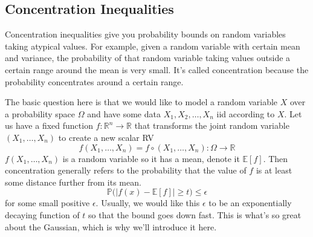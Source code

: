 \subsection{Concentration Inequalities}

  Concentration inequalities give you probability bounds on random variables taking atypical values. For example, given a random variable with certain mean and variance, the probability of that random variable taking values outside a certain range around the mean is very small. It's called concentration because the probability concentrates around a certain range. 

  The basic question here is that we would like to model a random variable $X$ over a probability space $\Omega$ and have some data $X_1, X_2, \ldots, X_n$ iid according to $X$. Let us have a fixed function $f: \mathbb{R}^n \longrightarrow \mathbb{R}$ that transforms the joint random variable $(X_1, \ldots, X_n)$ to create a new scalar RV 
  \begin{equation}
    f(X_1, \ldots, X_n) = f \circ (X_1, \ldots, X_n) : \Omega \longrightarrow \mathbb{R}
  \end{equation}
  $f(X_1, \ldots, X_n)$ is a random variable so it has a mean, denote it $\mathbb{E}[f]$. Then concentration generally refers to the probability that the value of $f$ is at least some distance further from its mean. 
  \begin{equation}
    \mathbb{P} \big( |f(x) - \mathbb{E}[f] | \geq t \big) \leq \epsilon
  \end{equation}
  for some small positive $\epsilon$. Usually, we would like this $\epsilon$ to be an exponentially decaying function of $t$ so that the bound goes down fast. This is what's so great about the Gaussian, which is why we'll introduce it here. 

